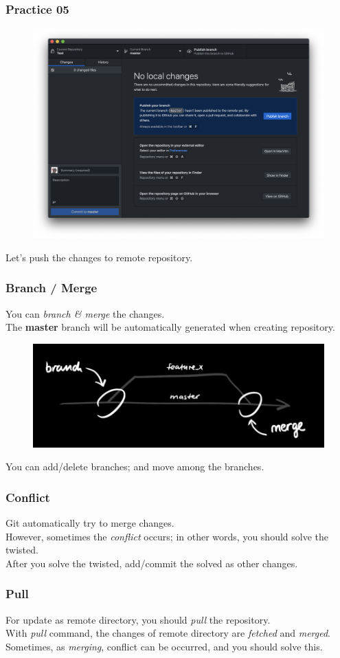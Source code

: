 \documentclass[aspectratio=169]{beamer}
\begin{document}
	\begin{frame}
		\frametitle{Practice 05}
		\begin{figure}
			\centering
			\includegraphics[width=0.5 \linewidth]{figures/5.png}
		\end{figure}
		Let's push the changes to remote repository. 
	\end{frame}

	\begin{frame}
		\frametitle{Branch / Merge}
		You can \textit{branch \& merge} the changes. \\
		The \textbf{master} branch will be automatically generated when creating repository. 
		\begin{figure}
			\centering
			\includegraphics[width=0.5 \linewidth]{figures/branches.png}
		\end{figure}
		You can add/delete branches; and move among the branches. 
	\end{frame}

	\begin{frame}
		\frametitle{Conflict}
		Git automatically try to merge changes. \\
		However, sometimes the \textit{conflict} occurs; in other words, you should solve the twisted. \\
		After you solve the twisted, add/commit the solved as other changes. 
	\end{frame}

	\begin{frame}
		\frametitle{Pull}
		For update as remote directory, you should \textit{pull} the repository. \\
		With \textit{pull} command, the changes of remote directory are \textit{fetched} and \textit{merged}. \\
		Sometimes, as \textit{merging}, conflict can be occurred, and you should solve this. 
	\end{frame}
\end{document}
